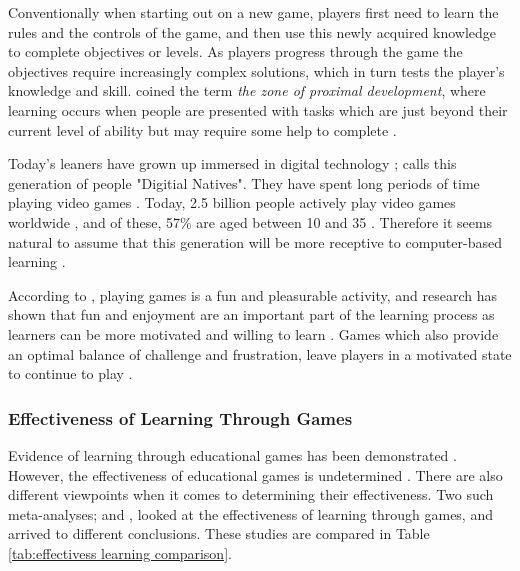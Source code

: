 \documentclass[a4paper,11.5pt]{report}
\numberwithin{figure}{section}
\numberwithin{table}{section}
\numberwithin{equation}{section}
\numberwithin{equation}{section}
\begin{document}
Conventionally when starting out on a new game, players first need to learn the rules and the controls of the game, and then use this newly acquired knowledge to complete objectives or levels. As players progress through the game the objectives require increasingly complex solutions, which in turn tests the player's knowledge and skill. \citeauthor{vygotsky1978} coined the term \textit{the zone of proximal development}, where learning occurs when people are presented with tasks which are just beyond their current level of ability but may require some help to complete \citep{vygotsky1978}.

Today's leaners have grown up immersed in digital technology \citep{Prensky2001}; \citeauthor{Prensky2001} calls this generation of people "Digitial Natives". They have spent long periods of time playing video games \citep{prensky2003}. Today, 2.5 billion people actively play video games worldwide \citep{Statista}, and of these, 57\% are aged between 10 and 35 \citep{Statistanewzoo}. Therefore it seems natural to assume that this generation will be more receptive to computer-based learning \citep{Girard2013}.

According to \citet{Prensky2001}, playing games is a fun and pleasurable activity, and research has shown that fun and enjoyment are an important part of the learning process as learners can be more motivated and willing to learn \citep{Bisson1996, Cordova1996}. Games which also provide an optimal balance of challenge and frustration, leave players in a motivated state to continue to play \citep{Gee2003}.


\subsubsection{Effectiveness of Learning Through Games}

Evidence of learning through educational games has been demonstrated \citep{Connolly2012, Pieter2013, Girard2013}. However, the effectiveness of educational games is undetermined \citep{Connolly2012, Girard2013}. There are also different viewpoints when it comes to determining their effectiveness. Two such meta-analyses; \citet{Pieter2013} and \citet{Girard2013}, looked at the effectiveness of learning through games, and arrived to different conclusions. These studies are compared in Table \ref{tab:effectivess learning comparison}.
\end{document}
